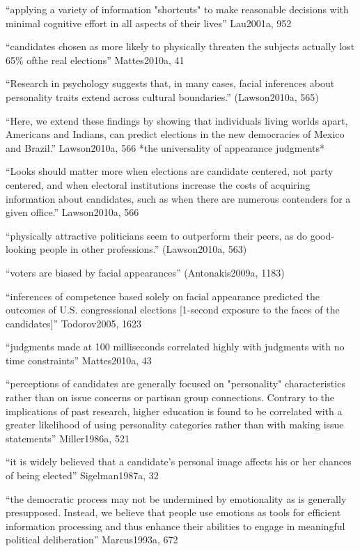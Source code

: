 ``applying a variety of information "shortcuts" to make reasonable decisions with minimal cognitive effort in all aspects of their lives'' Lau2001a, 952


``candidates chosen as more likely to physically threaten the subjects actually lost 65\% ofthe real elections'' Mattes2010a, 41

``Research in psychology suggests that, in many cases, facial inferences about personality traits extend across cultural boundaries.'' (Lawson2010a, 565)

``Here, we extend these findings by showing that individuals living worlds apart, Americans and Indians, can predict elections in the new democracies of Mexico and Brazil.'' Lawson2010a, 566 *the universality of appearance judgments*

``Looks should matter more when elections are candidate centered, not party centered, and when electoral institutions increase the costs of acquiring information about candidates, such as when there are numerous contenders for a given office.'' Lawson2010a, 566

``physically attractive politicians seem to outperform their peers, as do good-looking people in other professions.'' (Lawson2010a, 563)

``voters are biased by facial appearances'' (Antonakis2009a, 1183)


	
	``inferences of competence based solely on facial appearance predicted the outcomes of U.S. congressional elections [1-second exposure to the faces of the candidates]'' Todorov2005, 1623

	``judgments made at 100 milliseconds correlated highly with judgments with no time constraints'' Mattes2010a, 43

``perceptions of candidates are generally focused on "personality" characteristics rather than on issue concerns or partisan group connections. Contrary to the implications of past research, higher education is found to be correlated with a greater likelihood of using personality categories rather than with making issue statements'' Miller1986a, 521

``it is widely believed that a candidate's personal image affects his or her chances of being elected'' Sigelman1987a, 32

``the democratic process may not be undermined by emotionality as is generally presupposed. Instead, we believe that people use emotions as tools for efficient information processing and thus enhance their abilities to engage in meaningful political deliberation'' Marcus1993a, 672

